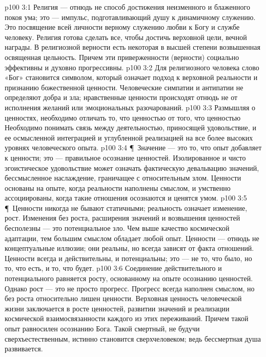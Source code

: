 \vs p100 3:1 Религия --- отнюдь не способ достижения неизменного и блаженного покоя ума; это --- импульс, подготавливающий душу к динамичному служению. Это посвящение всей личности верному служению любви к Богу и службе человеку. Религия готова сделать все, чтобы достичь верховной цели, вечной награды. В религиозной верности есть некоторая в высшей степени возвышенная освященная цельность. Причем эти приверженности (верности) социально эффективны и духовно прогрессивны.
\vs p100 3:2 Для религиозного человека слово «Бог» становится символом, который означает подход к верховной реальности и признанию божественной ценности. Человеческие симпатии и антипатии не определяют добра и зла; нравственные ценности происходят отнюдь не от исполнения желаний или эмоциональных разочарований.
\vs p100 3:3 Размышляя о ценностях, необходимо отличать то, что ценностью  от того, что ценностью  Необходимо понимать связь между деятельностью, приносящей удовольствие, и ее осмысленной интеграцией и углубленной реализацией на все более высоких уровнях человеческого опыта.
\vs p100 3:4 \P\ Значение --- это то, что опыт добавляет к ценности; это --- правильное осознание ценностей. Изолированное и чисто эгоистическое удовольствие может означать фактическую девальвацию значений, бессмысленное наслаждение, граничащее с относительным злом. Ценности основаны на опыте, когда реальности наполнены смыслом, и умственно ассоциированы, когда такие отношения осознаются и ценятся умом.
\vs p100 3:5 \P\ Ценности никогда не бывают статичными; реальность означает изменение, рост. Изменения без роста, расширения значений и возвышения ценностей бесполезны --- это потенциальное зло. Чем выше качество космической адаптации, тем большим смыслом обладает любой опыт. Ценности --- отнюдь не концептуальные иллюзии; они реальны, но всегда зависят от факта отношений. Ценности всегда и действительны, и потенциальны; это --- не то, что было, но то, что есть, и то, что будет.
\vs p100 3:6 Соединение действительного и потенциального равняется росту, основанному на опыте осознанию ценностей. Однако рост --- это не просто прогресс. Прогресс всегда наполнен смыслом, но без роста относительно лишен ценности. Верховная ценность человеческой жизни заключается в росте ценностей, развитии значений и реализации космической взаимосвязанности каждого из этих переживаний. Причем такой опыт равносилен осознанию Бога. Такой смертный, не будучи сверхъестественным, истинно становится сверхчеловеком; ведь бессмертная душа развивается.
